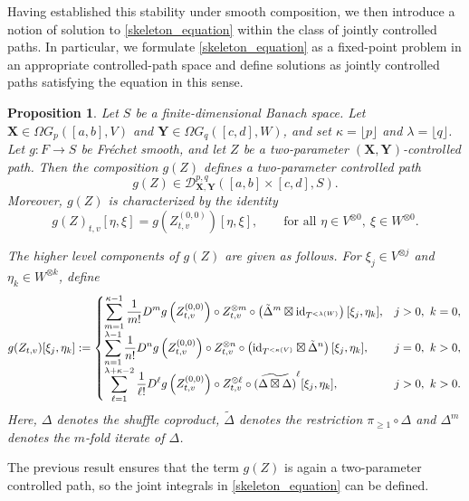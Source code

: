 \documentclass{article}%
\newtheorem{proposition}[theorem]{Proposition}
\begin{document}
Having established this stability under smooth composition, we then introduce a notion of solution to \eqref{skeleton_equation} within the class of jointly controlled paths.
In particular, we formulate \eqref{skeleton_equation} as a fixed-point problem in an appropriate controlled-path space and define solutions as jointly controlled paths satisfying the equation in this sense.

\begin{proposition}\label{stability_under_composition}
Let $S$ be a finite-dimensional Banach space. Let $\mathbf{X}\in \Omega G_p([a,b],V)$ and $\mathbf{Y}\in \Omega G_q([c,d],W)$, and set $\kappa=\lfloor p\rfloor$ and $\lambda=\lfloor q\rfloor$. Let $g\colon F\to S$ be Fr\'echet smooth, and let $Z$ be a two-parameter $(\mathbf{X},\mathbf{Y})$-controlled path.
Then the composition $g(Z)$ defines a two-parameter controlled path
\[
g(Z) \in \mathcal{D}^{p,q}_{\mathbf{X},\mathbf{Y}}([a,b]\times[c,d], S).
\]
Moreover, $g(Z)$ is characterized by the identity
\[
g(Z)_{t,v}[\eta,\xi] = g\left(Z^{(0,0)}_{t,v}\right)[\eta,\xi],
\qquad
\text{for all } \eta \in V^{\otimes 0},\ \xi \in W^{\otimes 0}.
\]

The higher level components of $g(Z)$ are given as follows. For
$\xi_j \in V^{\otimes j}$ and $\eta_k \in W^{\otimes k}$, define
\[
g(Z_{t,v})[\xi_j,\eta_k] :=
\begin{cases}
\displaystyle
\displaystyle
\sum_{m=1}^{\kappa-1} \frac{1}{m!}
D^m g\left(Z^{(0,0)}_{t,v}\right) \circ Z_{t,v}^{\otimes m}
\circ \left(\tilde{\Delta}^m \boxtimes \mathrm{id}_{T^{<\lambda(W)}}\right)
[\xi_j,\eta_k],
& j>0,\ k=0, \\[2ex]
\displaystyle
\sum_{n=1}^{\lambda-1} \frac{1}{n!}
D^n g\left(Z^{(0,0)}_{t,v}\right) \circ Z_{t,v}^{\otimes n}
\circ \left(\mathrm{id}_{T^{<\kappa(V)}} \boxtimes \tilde{\Delta}^n\right)
[\xi_j,\eta_k],
& j=0,\ k>0, \\[2ex]
\displaystyle
\sum_{\ell=1}^{\lambda+\kappa-2} \frac{1}{\ell!}
D^\ell g\left(Z^{(0,0)}_{t,v}\right) \circ Z_{t,v}^{\otimes \ell}
\circ \widetilde{(\Delta \boxtimes \Delta)}^{\ell}
[\xi_j,\eta_k],
& j>0,\ k>0 .
\end{cases}
\]
Here, $\Delta$ denotes the shuffle coproduct, $\tilde{\Delta}$
denotes the restriction $\pi_{\geq 1} \circ \Delta$ and $\Delta^m$ denotes the $m$-fold iterate of $\Delta$.
\end{proposition}
The previous result ensures that the term $g(Z)$ is again a two-parameter controlled path, so the joint integrals in \eqref{skeleton_equation} can be defined.  
\end{document}

